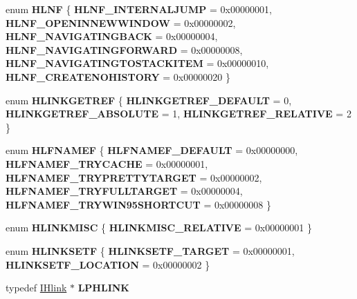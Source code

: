 \begin{DoxyCompactItemize}
\item 
\mbox{\label{interface_i_hlink_ae9d91f0807caafbdfa61e182713f7fbb}} 
enum {\bfseries H\+L\+NF} \{ \newline
{\bfseries H\+L\+N\+F\+\_\+\+I\+N\+T\+E\+R\+N\+A\+L\+J\+U\+MP} = 0x00000001, 
{\bfseries H\+L\+N\+F\+\_\+\+O\+P\+E\+N\+I\+N\+N\+E\+W\+W\+I\+N\+D\+OW} = 0x00000002, 
{\bfseries H\+L\+N\+F\+\_\+\+N\+A\+V\+I\+G\+A\+T\+I\+N\+G\+B\+A\+CK} = 0x00000004, 
{\bfseries H\+L\+N\+F\+\_\+\+N\+A\+V\+I\+G\+A\+T\+I\+N\+G\+F\+O\+R\+W\+A\+RD} = 0x00000008, 
\newline
{\bfseries H\+L\+N\+F\+\_\+\+N\+A\+V\+I\+G\+A\+T\+I\+N\+G\+T\+O\+S\+T\+A\+C\+K\+I\+T\+EM} = 0x00000010, 
{\bfseries H\+L\+N\+F\+\_\+\+C\+R\+E\+A\+T\+E\+N\+O\+H\+I\+S\+T\+O\+RY} = 0x00000020
 \}
\item 
\mbox{\label{interface_i_hlink_a2e8cd90eebf584d2dbab7285a0c86497}} 
enum {\bfseries H\+L\+I\+N\+K\+G\+E\+T\+R\+EF} \{ {\bfseries H\+L\+I\+N\+K\+G\+E\+T\+R\+E\+F\+\_\+\+D\+E\+F\+A\+U\+LT} = 0, 
{\bfseries H\+L\+I\+N\+K\+G\+E\+T\+R\+E\+F\+\_\+\+A\+B\+S\+O\+L\+U\+TE} = 1, 
{\bfseries H\+L\+I\+N\+K\+G\+E\+T\+R\+E\+F\+\_\+\+R\+E\+L\+A\+T\+I\+VE} = 2
 \}
\item 
\mbox{\label{interface_i_hlink_a5c4ecbf98bc489de522e894f44dec37d}} 
enum {\bfseries H\+L\+F\+N\+A\+M\+EF} \{ \newline
{\bfseries H\+L\+F\+N\+A\+M\+E\+F\+\_\+\+D\+E\+F\+A\+U\+LT} = 0x00000000, 
{\bfseries H\+L\+F\+N\+A\+M\+E\+F\+\_\+\+T\+R\+Y\+C\+A\+C\+HE} = 0x00000001, 
{\bfseries H\+L\+F\+N\+A\+M\+E\+F\+\_\+\+T\+R\+Y\+P\+R\+E\+T\+T\+Y\+T\+A\+R\+G\+ET} = 0x00000002, 
{\bfseries H\+L\+F\+N\+A\+M\+E\+F\+\_\+\+T\+R\+Y\+F\+U\+L\+L\+T\+A\+R\+G\+ET} = 0x00000004, 
\newline
{\bfseries H\+L\+F\+N\+A\+M\+E\+F\+\_\+\+T\+R\+Y\+W\+I\+N95\+S\+H\+O\+R\+T\+C\+UT} = 0x00000008
 \}
\item 
\mbox{\label{interface_i_hlink_a297ee911b2327a50cbb2fa36b7503a37}} 
enum {\bfseries H\+L\+I\+N\+K\+M\+I\+SC} \{ {\bfseries H\+L\+I\+N\+K\+M\+I\+S\+C\+\_\+\+R\+E\+L\+A\+T\+I\+VE} = 0x00000001
 \}
\item 
\mbox{\label{interface_i_hlink_a9c1435b48ef9c536f68fba7bdfe01416}} 
enum {\bfseries H\+L\+I\+N\+K\+S\+E\+TF} \{ {\bfseries H\+L\+I\+N\+K\+S\+E\+T\+F\+\_\+\+T\+A\+R\+G\+ET} = 0x00000001, 
{\bfseries H\+L\+I\+N\+K\+S\+E\+T\+F\+\_\+\+L\+O\+C\+A\+T\+I\+ON} = 0x00000002
 \}
\item 
\mbox{\label{interface_i_hlink_a8f4b3d3ba335207d9934aaacb64f255f}} 
typedef \hyperlink{interface_i_hlink}{I\+Hlink} $\ast$ {\bfseries L\+P\+H\+L\+I\+NK}
\end{DoxyCompactItemize}
